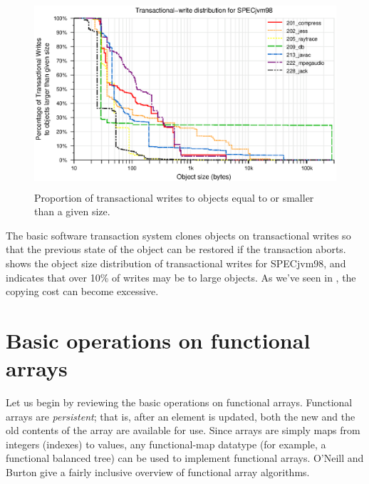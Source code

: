\begin{figure}
\begin{center}
\includegraphics[height=2.75in,clip=true]{Figures/tr-w-all-1}%
\end{center}%
\caption{Proportion of transactional writes to objects equal to or
  smaller than a given size.}
\label{fig:tr-w}%
\end{figure}%
The basic \apex software transaction system clones objects on
transactional writes so that the previous state of the object can be
restored if the transaction aborts.   shows the object
size distribution of transactional writes for SPECjvm98, and
indicates that over 10\% of writes may be to large objects.
As we've seen in , the copying cost can become
excessive.


\section{Basic operations on functional arrays}\label{sec:naivefun}
Let us begin by reviewing the basic operations on functional arrays.
Functional arrays are \emph{persistent}; that is,
after an element is updated, both the new and the old contents of the
array are available for use.  Since arrays are simply maps from
integers (indexes) to values, any functional-map datatype (for
example, a functional balanced tree) can be used to implement
functional arrays.  O'Neill and Burton \cite{ONeillBu97} give a fairly
inclusive overview of functional array algorithms.

